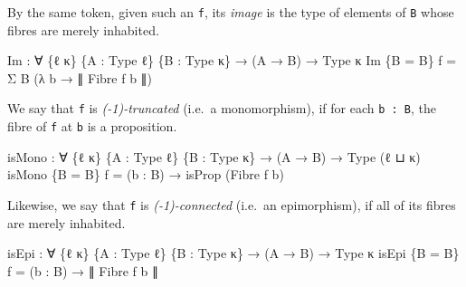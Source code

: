\documentclass[
  11pt,
  oneside,
  article]{memoir}
\newenvironment{Shaded}{}{}
\newcommand{\NormalTok}[1]{#1}
\newcommand{\OtherTok}[1]{\textcolor[rgb]{0.00,0.44,0.13}{#1}}
\theoremstyle{definition}
\theoremstyle{plain}
\newcommand{\0}{\textsf{0}}
\newcommand{\1}{\tn{\textsf{1}}}
\begin{document}
By the same token, given such an \texttt{f}, its \emph{image} is the
type of elements of \texttt{B} whose fibres are merely inhabited.

\begin{Shaded}
\begin{Highlighting}[]
\NormalTok{Im }\OtherTok{:} \OtherTok{∀} \OtherTok{\{}\NormalTok{ℓ κ}\OtherTok{\}} \OtherTok{\{}\NormalTok{A }\OtherTok{:}\NormalTok{ Type ℓ}\OtherTok{\}} \OtherTok{\{}\NormalTok{B }\OtherTok{:}\NormalTok{ Type κ}\OtherTok{\}} \OtherTok{→} \OtherTok{(}\NormalTok{A }\OtherTok{→}\NormalTok{ B}\OtherTok{)} \OtherTok{→}\NormalTok{ Type κ}
\NormalTok{Im }\OtherTok{\{}\NormalTok{B }\OtherTok{=}\NormalTok{ B}\OtherTok{\}}\NormalTok{ f }\OtherTok{=}\NormalTok{ Σ B }\OtherTok{(λ}\NormalTok{ b }\OtherTok{→}\NormalTok{ ∥ Fibre f b ∥}\OtherTok{)}
\end{Highlighting}
\end{Shaded}

We say that \texttt{f} is \emph{(-1)-truncated} (i.e.~a monomorphism),
if for each \texttt{b\ :\ B}, the fibre of \texttt{f} at \texttt{b} is a
proposition.

\begin{Shaded}
\begin{Highlighting}[]
\NormalTok{isMono }\OtherTok{:} \OtherTok{∀} \OtherTok{\{}\NormalTok{ℓ κ}\OtherTok{\}} \OtherTok{\{}\NormalTok{A }\OtherTok{:}\NormalTok{ Type ℓ}\OtherTok{\}} \OtherTok{\{}\NormalTok{B }\OtherTok{:}\NormalTok{ Type κ}\OtherTok{\}} \OtherTok{→} \OtherTok{(}\NormalTok{A }\OtherTok{→}\NormalTok{ B}\OtherTok{)} \OtherTok{→}\NormalTok{ Type }\OtherTok{(}\NormalTok{ℓ ⊔ κ}\OtherTok{)}
\NormalTok{isMono }\OtherTok{\{}\NormalTok{B }\OtherTok{=}\NormalTok{ B}\OtherTok{\}}\NormalTok{ f }\OtherTok{=} \OtherTok{(}\NormalTok{b }\OtherTok{:}\NormalTok{ B}\OtherTok{)} \OtherTok{→}\NormalTok{ isProp }\OtherTok{(}\NormalTok{Fibre f b}\OtherTok{)}
\end{Highlighting}
\end{Shaded}

Likewise, we say that \texttt{f} is \emph{(-1)-connected} (i.e.~an
epimorphism), if all of its fibres are merely inhabited.

\begin{Shaded}
\begin{Highlighting}[]
\NormalTok{isEpi }\OtherTok{:} \OtherTok{∀} \OtherTok{\{}\NormalTok{ℓ κ}\OtherTok{\}} \OtherTok{\{}\NormalTok{A }\OtherTok{:}\NormalTok{ Type ℓ}\OtherTok{\}} \OtherTok{\{}\NormalTok{B }\OtherTok{:}\NormalTok{ Type κ}\OtherTok{\}} \OtherTok{→} \OtherTok{(}\NormalTok{A }\OtherTok{→}\NormalTok{ B}\OtherTok{)} \OtherTok{→}\NormalTok{ Type κ}
\NormalTok{isEpi }\OtherTok{\{}\NormalTok{B }\OtherTok{=}\NormalTok{ B}\OtherTok{\}}\NormalTok{ f }\OtherTok{=} \OtherTok{(}\NormalTok{b }\OtherTok{:}\NormalTok{ B}\OtherTok{)} \OtherTok{→}\NormalTok{ ∥ Fibre f b ∥}
\end{Highlighting}
\end{Shaded}
\end{document}
